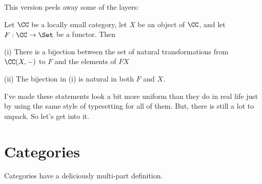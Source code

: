 \noindent\goodbreak This version peels away some of the layers:

\begin{lemma}[Yoneda]\label{yoneda6} Let $\CC$ be a locally small category, let $X$ be an
object of $\CC$, and let $F: \CC \to \Set$ be a functor. Then

(i) There is a bijection between the set of natural transformations from $\CC(X, -)$ to
$F$ and the elements of $FX$

(ii) The bijection in (i) is natural in both $F$ and $X$.
\end{lemma}

\noindent
I've made these statements look a bit more uniform than they do in real life just by using
the same style of typesetting for all of them. But, there is still a lot to unpack. So
let's get into it.

\section{Categories}

Categories have a deliciously multi-part definition.

